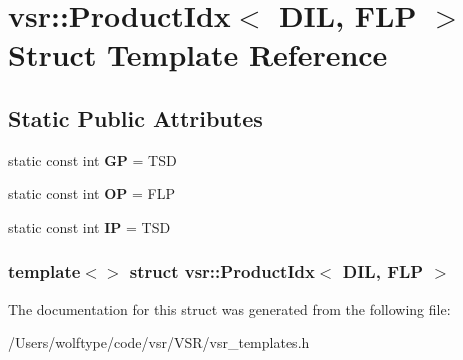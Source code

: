 \hypertarget{structvsr_1_1_product_idx_3_01_d_i_l_00_01_f_l_p_01_4}{\section{vsr\-:\-:Product\-Idx$<$ D\-I\-L, F\-L\-P $>$ Struct Template Reference}
\label{structvsr_1_1_product_idx_3_01_d_i_l_00_01_f_l_p_01_4}
}
\subsection*{Static Public Attributes}
\begin{DoxyCompactItemize}
\item 
\hypertarget{structvsr_1_1_product_idx_3_01_d_i_l_00_01_f_l_p_01_4_af04dd3629796218d93c9789b22eea41f}{static const int {\bfseries G\-P} = T\-S\-D}\label{structvsr_1_1_product_idx_3_01_d_i_l_00_01_f_l_p_01_4_af04dd3629796218d93c9789b22eea41f}

\item 
\hypertarget{structvsr_1_1_product_idx_3_01_d_i_l_00_01_f_l_p_01_4_a952b5d84ce8c1408e56902a6f5b256bf}{static const int {\bfseries O\-P} = F\-L\-P}\label{structvsr_1_1_product_idx_3_01_d_i_l_00_01_f_l_p_01_4_a952b5d84ce8c1408e56902a6f5b256bf}

\item 
\hypertarget{structvsr_1_1_product_idx_3_01_d_i_l_00_01_f_l_p_01_4_ace1ebdef0ca495c28f6a091fb248c3cf}{static const int {\bfseries I\-P} = T\-S\-D}\label{structvsr_1_1_product_idx_3_01_d_i_l_00_01_f_l_p_01_4_ace1ebdef0ca495c28f6a091fb248c3cf}

\end{DoxyCompactItemize}
\subsubsection*{template$<$$>$ struct vsr\-::\-Product\-Idx$<$ D\-I\-L, F\-L\-P $>$}



The documentation for this struct was generated from the following file\-:\begin{DoxyCompactItemize}
\item 
/\-Users/wolftype/code/vsr/\-V\-S\-R/vsr\-\_\-templates.\-h\end{DoxyCompactItemize}
